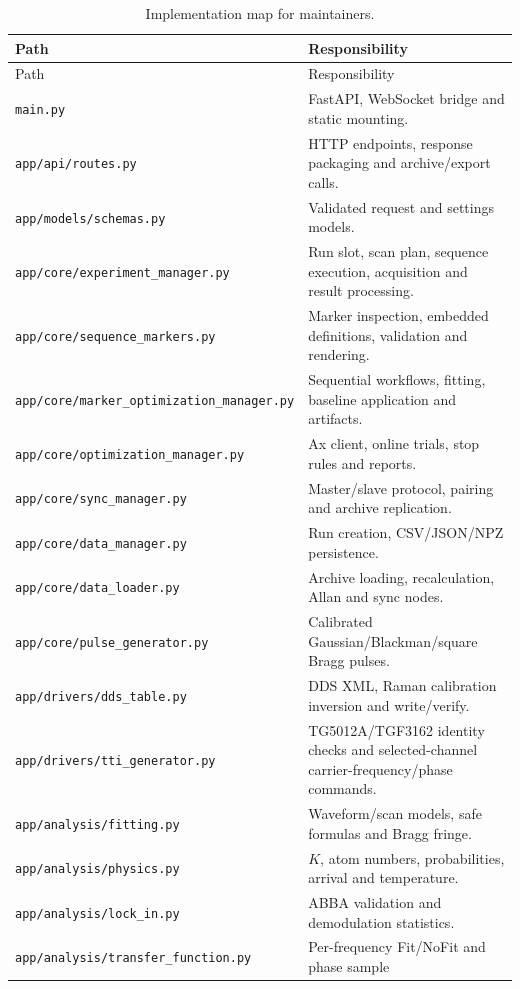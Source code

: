 \documentclass[11pt,oneside,openany]{book}
\newcommand{\pathcode}[1]{\nolinkurl{#1}}
\begin{document}
\begin{longtable}{p{} p{}}
\caption{Implementation map for maintainers.}\\
\toprule Path & Responsibility\\ \midrule
\endfirsthead
\toprule Path & Responsibility\\ \midrule
\endhead
\pathcode{main.py} & FastAPI, WebSocket bridge and static mounting.\\
\pathcode{app/api/routes.py} & HTTP endpoints, response packaging and archive/export calls.\\
\pathcode{app/models/schemas.py} & Validated request and settings models.\\
\pathcode{app/core/experiment_manager.py} & Run slot, scan plan, sequence execution,
acquisition and result processing.\\
\pathcode{app/core/sequence_markers.py} & Marker inspection, embedded definitions,
validation and rendering.\\
\pathcode{app/core/marker_optimization_manager.py} & Sequential workflows, fitting,
baseline application and artifacts.\\
\pathcode{app/core/optimization_manager.py} & Ax client, online trials, stop rules and
reports.\\
\pathcode{app/core/sync_manager.py} & Master/slave protocol, pairing and archive
replication.\\
\pathcode{app/core/data_manager.py} & Run creation, CSV/JSON/NPZ persistence.\\
\pathcode{app/core/data_loader.py} & Archive loading, recalculation, Allan and sync nodes.\\
\pathcode{app/core/pulse_generator.py} & Calibrated Gaussian/Blackman/square Bragg pulses.\\
\pathcode{app/drivers/dds_table.py} & DDS XML, Raman calibration inversion and write/verify.\\
\pathcode{app/drivers/tti_generator.py} & TG5012A/TGF3162 identity checks and selected-channel
carrier-frequency/phase commands.\\
\pathcode{app/analysis/fitting.py} & Waveform/scan models, safe formulas and Bragg fringe.\\
\pathcode{app/analysis/physics.py} & $K$, atom numbers, probabilities, arrival and temperature.\\
\pathcode{app/analysis/lock_in.py} & ABBA validation and demodulation statistics.\\
\pathcode{app/analysis/transfer_function.py} & Per-frequency Fit/NoFit and phase sample

\end{longtable}
\end{document}

